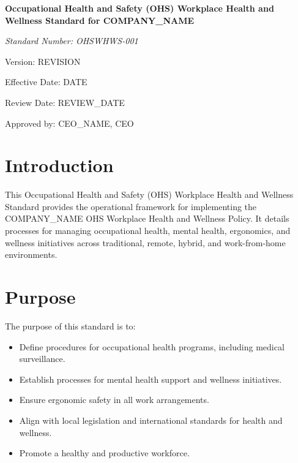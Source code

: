 \documentclass[12pt]{article}
\begin{document}
\begin{titlepage}
    \centering
    \vspace*{2cm}
    {\LARGE\bfseries Occupational Health and Safety (OHS) Workplace Health and Wellness Standard for {{COMPANY_NAME}}\par}
    \vspace{1cm}
    {\large\itshape Standard Number: OHSWHWS-001\par}
    \vspace{0.5cm}
    {\normalsize Version: {{REVISION}}\par}
    \vspace{0.5cm}
    {\normalsize Effective Date: {{DATE}}\par}
    \vspace{0.5cm}
    {\normalsize Review Date: {{REVIEW_DATE}}\par}
    \vspace{2cm}
    {\normalsize Approved by: {{CEO_NAME}}, CEO\par}
\end{titlepage}

\section{Introduction}
This Occupational Health and Safety (OHS) Workplace Health and Wellness Standard provides the operational framework for implementing the {{COMPANY_NAME}} OHS Workplace Health and Wellness Policy. It details processes for managing occupational health, mental health, ergonomics, and wellness initiatives across traditional, remote, hybrid, and work-from-home environments.

\section{Purpose}
The purpose of this standard is to:
\begin{itemize}
    \item Define procedures for occupational health programs, including medical surveillance.
    \item Establish processes for mental health support and wellness initiatives.
    \item Ensure ergonomic safety in all work arrangements.
    \item Align with local legislation and international standards for health and wellness.
    \item Promote a healthy and productive workforce.
\end{itemize}
\end{document}
